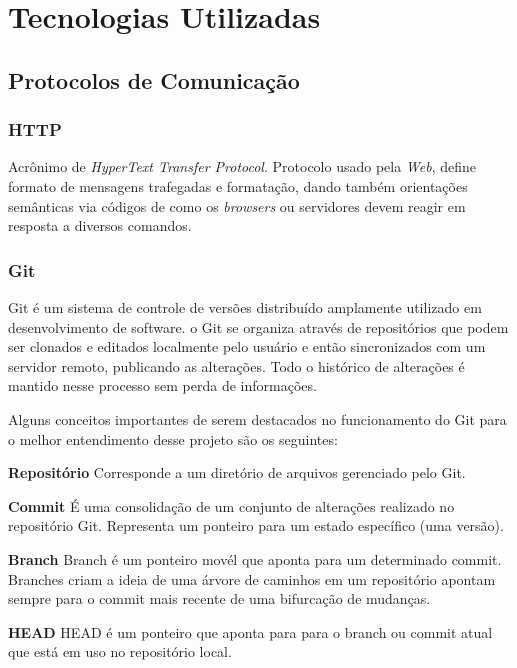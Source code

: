 \chapter{Tecnologias Utilizadas}
    \section{Protocolos de Comunicação}
        \subsection{HTTP}
	    Acrônimo de \textit{HyperText Transfer Protocol}. Protocolo usado pela \textit{Web}, define formato de mensagens trafegadas e formatação, dando também orientações semânticas via códigos\cite{httpcodes} de como os \textit{browsers} ou servidores devem reagir em resposta a diversos comandos.
	
	    \subsection{Git}
	        Git é um sistema de controle de versões distribuído amplamente utilizado em desenvolvimento de software. o Git se organiza através de repositórios que podem ser clonados e editados localmente pelo usuário e então sincronizados com um servidor remoto, publicando as alterações. Todo o histórico de alterações é mantido nesse processo sem perda de informações.
	        
	        Alguns conceitos importantes de serem destacados no funcionamento do Git para o melhor entendimento desse projeto são os seguintes:
	
        	\textbf{Repositório}
        	\newline
        	Corresponde a um diretório de arquivos gerenciado pelo Git.
        	
        	\textbf{Commit}
        	\newline
        	É uma consolidação de um conjunto de alterações realizado no repositório Git. Representa um ponteiro para um estado específico (uma versão).
        	
        	\textbf{Branch}
        	\newline
        	Branch é um ponteiro movél que aponta para um determinado commit. Branches criam a ideia de uma árvore de caminhos em um repositório apontam sempre para o commit mais recente de uma bifurcação de mudanças.
        	
        	\textbf{HEAD}
        	\newline
        	HEAD é um ponteiro que aponta para para o branch ou commit atual que está em uso no repositório local.
        	
